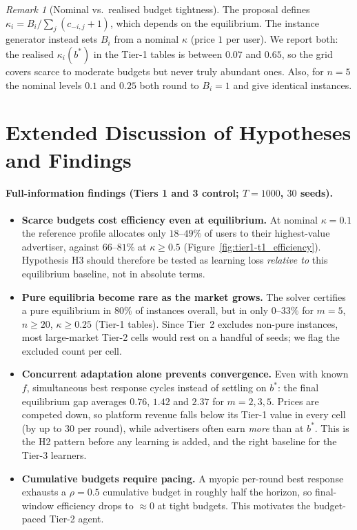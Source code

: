 \documentclass[11pt]{article}
\theoremstyle{remark}
\newtheorem{remark}{Remark}
\begin{document}
\begin{remark}[Nominal vs.\ realised budget tightness]\label{rem:kappa}
The proposal defines $\kappa_i=B_i/\sum_j(c_{-i,j}+1)$, which depends on the equilibrium. The instance
generator instead sets $B_i$ from a nominal $\kappa$ (price $1$ per user). We report both: the realised
$\kappa_i(b^*)$ in the Tier-1 tables is between $0.07$ and $0.65$, so the grid covers scarce to moderate
budgets but never truly abundant ones. Also, for $n=5$ the nominal levels $0.1$ and $0.25$ both
round to $B_i=1$ and give identical instances.
\end{remark}

\section{Extended Discussion of Hypotheses and Findings}\label{sec:supp_discussion}

\paragraph{Full-information findings (Tiers 1 and 3 control; $T=1000$, $30$ seeds).}
\begin{itemize}[leftmargin=*]
  \item \textbf{Scarce budgets cost efficiency even at equilibrium.} At nominal $\kappa=0.1$ the
  reference profile allocates only $18$--$49\%$ of users to their highest-value advertiser, against
  $66$--$81\%$ at $\kappa\ge0.5$ (Figure~\ref{fig:tier1-t1_efficiency}). Hypothesis H3 should therefore be
  tested as learning loss \emph{relative to} this equilibrium baseline, not in absolute terms.
  \item \textbf{Pure equilibria become rare as the market grows.} The solver certifies a pure
  equilibrium in $80\%$ of instances overall, but in only $0$--$33\%$ for $m=5$, $n\ge20$, $\kappa\ge0.25$
  (Tier-1 tables). Since Tier~2 excludes non-pure instances, most large-market Tier-2 cells would rest on a handful of
  seeds; we flag the excluded count per cell.
  \item \textbf{Concurrent adaptation alone prevents convergence.} Even with known $f$, simultaneous
  best response cycles instead of settling on $b^*$: the final equilibrium gap averages $0.76$, $1.42$ and
  $2.37$ for $m=2,3,5$. Prices are competed down, so platform revenue falls below its Tier-1 value in
  every cell (by up to $30$ per round), while advertisers often earn \emph{more} than at $b^*$. This is
  the H2 pattern before any learning is added, and the right baseline for the Tier-3 learners.
  \item \textbf{Cumulative budgets require pacing.} A myopic per-round best response exhausts a
  $\rho=0.5$ cumulative budget in roughly half the horizon, so final-window efficiency drops to $\approx 0$
  at tight budgets. This motivates the budget-paced Tier-2 agent.
\end{itemize}
\end{document}
